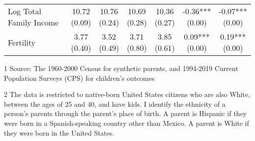 \begin{table}[H]
{\begin{threeparttable}
\begin{tabular}[t]{>{\raggedright\arraybackslash}p{5cm}cccccc}
Log Total Family Income & \specialcell{10.72\\(0.09)} & \specialcell{10.76\\(0.24)} & \specialcell{10.69\\(0.28)} & \specialcell{10.36\\(0.27)} & \specialcell{-0.36***\\(0.00)} & \specialcell{-0.07***\\(0.00)}\\
Fertility & \specialcell{3.77\\(0.40)} & \specialcell{3.52\\(0.49)} & \specialcell{3.71\\(0.80)} & \specialcell{3.85\\(0.61)} & \specialcell{0.09***\\(0.00)} & \specialcell{0.19***\\(0.00)}\\
\bottomrule
\end{tabular}
\begin{tablenotes}
\item[1] Source: The 1960-2000 Census for synthetic parents, and 1994-2019 Current Population Surveys (CPS) for children's outcomes
\item[2] The data is restricted to native-born United States citizens who are also White, between the ages of 25 and 40, and have kids. I identify the ethnicity of a person's parents through the parent's place of birth. A parent is Hispanic if they were born in a Spanish-speaking country other than Mexico. A parent is White if they were born in the United States.
\end{tablenotes}
\end{threeparttable}}
\end{table}
